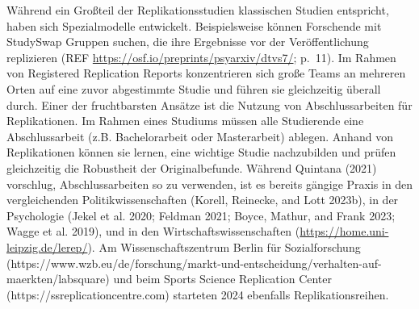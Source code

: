 \documentclass[
  letterpaper,
  DIV=11,
  numbers=noendperiod]{scrreprt}
\begin{document}
Während ein Großteil der Replikationsstudien klassischen Studien
entspricht, haben sich Spezialmodelle entwickelt. Beispielsweise können
Forschende mit StudySwap Gruppen suchen, die ihre Ergebnisse vor der
Veröffentlichung replizieren (REF
\url{https://osf.io/preprints/psyarxiv/dtvs7/}; p.~11). Im Rahmen von
Registered Replication Reports konzentrieren sich große Teams an
mehreren Orten auf eine zuvor abgestimmte Studie und führen sie
gleichzeitig überall durch. Einer der fruchtbarsten Ansätze ist die
Nutzung von Abschlussarbeiten für Replikationen. Im Rahmen eines
Studiums müssen alle Studierende eine Abschlussarbeit (z.B.
Bachelorarbeit oder Masterarbeit) ablegen. Anhand von Replikationen
können sie lernen, eine wichtige Studie nachzubilden und prüfen
gleichzeitig die Robustheit der Originalbefunde. Während Quintana (2021)
vorschlug, Abschlussarbeiten so zu verwenden, ist es bereits gängige
Praxis in den vergleichenden Politikwissenschaften (Korell, Reinecke,
and Lott 2023b), in der Psychologie (Jekel et al. 2020; Feldman 2021;
Boyce, Mathur, and Frank 2023; Wagge et al. 2019), und in den
Wirtschaftswissenschaften (\url{https://home.uni-leipzig.de/lerep/}). Am
Wissenschaftszentrum Berlin für Sozialforschung
(https://www.wzb.eu/de/forschung/markt-und-entscheidung/verhalten-auf-maerkten/labsquare)
und beim Sports Science Replication Center
(https://ssreplicationcentre.com) starteten 2024 ebenfalls
Replikationsreihen.
\end{document}
